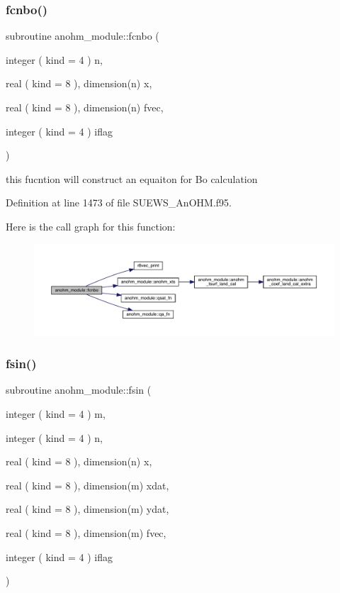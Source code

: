 \subsubsection{\texorpdfstring{fcnbo()}{fcnbo()}}
{\footnotesize\ttfamily subroutine anohm\+\_\+module\+::fcnbo (\begin{DoxyParamCaption}\item[{integer ( kind = 4 )}]{n,  }\item[{real ( kind = 8 ), dimension(n)}]{x,  }\item[{real ( kind = 8 ), dimension(n)}]{fvec,  }\item[{integer ( kind = 4 )}]{iflag }\end{DoxyParamCaption})}



this fucntion will construct an equaiton for Bo calculation 



Definition at line 1473 of file S\+U\+E\+W\+S\+\_\+\+An\+O\+H\+M.\+f95.

Here is the call graph for this function\+:\nopagebreak
\begin{figure}[H]
\begin{center}
\leavevmode
\includegraphics[width=350pt]{namespaceanohm__module_a6111dd73f21e92071faa29d426ae84f9_cgraph}
\end{center}
\end{figure}
\mbox{\label{namespaceanohm__module_a8d56836cb99e49028266fac2beaf5b95}} 
\subsubsection{\texorpdfstring{fsin()}{fsin()}}
{\footnotesize\ttfamily subroutine anohm\+\_\+module\+::fsin (\begin{DoxyParamCaption}\item[{integer ( kind = 4 )}]{m,  }\item[{integer ( kind = 4 )}]{n,  }\item[{real ( kind = 8 ), dimension(n)}]{x,  }\item[{real ( kind = 8 ), dimension(m)}]{xdat,  }\item[{real ( kind = 8 ), dimension(m)}]{ydat,  }\item[{real ( kind = 8 ), dimension(m)}]{fvec,  }\item[{integer ( kind = 4 )}]{iflag }\end{DoxyParamCaption})}



